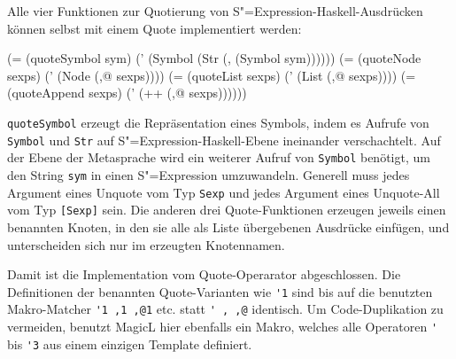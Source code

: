 \documentclass[11pt, a4paper, bibgerm]{scrbook}
\newcommand\icode[1]{\lstinline?#1?}
\newcommand{\sexp}{S"=Expression}
\begin{document}
Alle vier Funktionen zur Quotierung von \sexp{}-Haskell-Ausdrücken
können selbst mit einem Quote implementiert werden:
\begin{code}
    (= (quoteSymbol sym)
       (' (Symbol (Str (, (Symbol sym))))))
    (= (quoteNode sexps)
       (' (Node (,@ sexps))))
    (= (quoteList sexps)
       (' (List (,@ sexps))))
    (= (quoteAppend sexps)
       (' (++ (,@ sexps))))))
\end{code}
\icode{quoteSymbol} erzeugt die Repräsentation eines Symbols, indem es
Aufrufe von \icode{Symbol} und \icode{Str} auf \sexp{}-Haskell-Ebene
ineinander verschachtelt. Auf der Ebene der Metasprache wird ein
weiterer Aufruf von \icode{Symbol} benötigt, um den String \icode{sym}
in einen \sexp{} umzuwandeln. Generell muss jedes Argument eines Unquote
vom Typ \icode{Sexp} und jedes Argument eines Unquote-All vom Typ
\icode{[Sexp]} sein. Die anderen drei Quote-Funktionen erzeugen jeweils
einen benannten Knoten, in den sie alle als Liste übergebenen Ausdrücke
einfügen, und unterscheiden sich nur im erzeugten Knotennamen.

Damit ist die Implementation vom Quote-Operarator abgeschlossen. Die
Definitionen der benannten Quote-Varianten wie \icode{'1} sind bis auf
die benutzten Makro-Matcher \icode{'1 ,1 ,@1} etc. statt \icode{' , ,@}
identisch. Um Code-Duplikation zu vermeiden, benutzt MagicL hier
ebenfalls ein Makro, welches alle Operatoren \icode{'}
bis \icode{'3} aus einem einzigen Template definiert.
\end{document}
